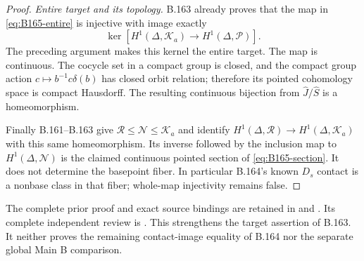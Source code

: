 \begin{proof}
\emph{Entire target and its topology.}
B.163 already proves that the map in \eqref{eq:B165-entire}
is injective with image exactly
\[
 \ker\!\left[
 H^1(\Delta,\mathcal K_a)\longrightarrow H^1(\Delta,\mathcal P)
 \right].
\]
The preceding argument makes this kernel the entire target.
The map is continuous. The cocycle set in a compact group is
closed, and the compact group action
\(c\mapsto b^{-1}c\delta(b)\) has closed orbit relation;
therefore its pointed cohomology space is compact Hausdorff.
The resulting continuous bijection from
\(\widehat J/\widehat S\) is a homeomorphism.

Finally B.161--B.163 give
\(\mathcal R\le\mathcal N\le\mathcal K_a\) and identify
\(H^1(\Delta,\mathcal R)\to H^1(\Delta,\mathcal K_a)\)
with this same homeomorphism. Its inverse followed by the inclusion
map to \(H^1(\Delta,\mathcal N)\) is the claimed continuous pointed
section of \eqref{eq:B165-section}.
It does not determine the basepoint fiber. In particular B.164's
known \(D_s\) contact is a nonbase class in that fiber; whole-map
injectivity remains false.
\end{proof}

\begingroup\footnotesize\raggedright
The complete prior proof and exact source bindings are retained in
 and
.
Its complete independent review is
.
This strengthens the target assertion of B.163. It neither proves
the remaining contact-image equality of B.164 nor the separate
global Main B comparison.
\par\endgroup
